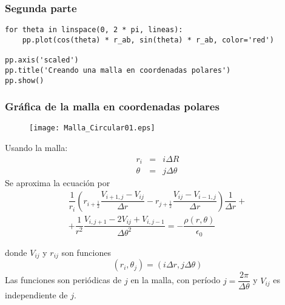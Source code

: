 \begin{frame}[fragile]
\frametitle{Segunda parte}
\begin{lstlisting}
for theta in linspace(0, 2 * pi, lineas):
    pp.plot(cos(theta) * r_ab, sin(theta) * r_ab, color='red')

pp.axis('scaled')
pp.title('Creando una malla en coordenadas polares')
pp.show()
\end{lstlisting}
\end{frame}
\begin{frame}[fragile]
\frametitle{Gráfica de la malla en coordenadas polares}
\begin{figure}
\centering
\texttt{[image: Malla\_Circular01.eps]} 
\end{figure}
\end{frame}
\begin{frame}
Usando la malla:
\begin{eqnarray*}
r_{i} &=& i \Delta R \\
\theta &=& j \Delta \theta
\end{eqnarray*}
Se aproxima la ecuación por
\[ \begin{split}
\dfrac{1}{r_{i}} \left( r_{i+\frac{1}{2}} \dfrac{V_{i+1,j} - V_{ij}}{\Delta r} - r_{j+\frac{1}{2}} \dfrac{V_{ij}-V_{i-1,j}}{\Delta r} \right) \dfrac{1}{\Delta r} + \\
+ \dfrac{1}{r^{2}} \dfrac{V_{i,j+1}-2V_{ij}+V_{i,j-1}}{\Delta \theta^{2}} = - \dfrac{\rho(r,\theta)}{\epsilon_{0}}
\end{split} \]
\end{frame}
\begin{frame}
donde $V_{ij}$ y $r_{ij}$ son funciones
\[ (r_{i}, \theta_{j}) = (i \Delta r, j \Delta \theta) \]
Las funciones son periódicas de $j$ en la malla, con período $j=\dfrac{2 \pi}{\Delta \theta}$  y $V_{ij}$ es independiente de $j$.
\end{frame}

